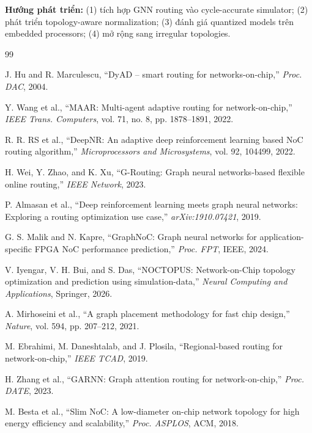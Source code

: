 \documentclass[conference]{IEEEtran}
\begin{document}
\textbf{Hướng phát triển:} (1) tích hợp GNN routing vào cycle-accurate
simulator; (2) phát triển topology-aware normalization; (3) đánh giá
quantized models trên embedded processors; (4) mở rộng sang irregular
topologies.


\begin{thebibliography}{99}

 J. Hu and R. Marculescu, ``DyAD -- smart routing for networks-on-chip,'' \textit{Proc. DAC}, 2004.

 Y. Wang et al., ``MAAR: Multi-agent adaptive routing for network-on-chip,'' \textit{IEEE Trans. Computers}, vol. 71, no. 8, pp. 1878--1891, 2022.

 R. R. RS et al., ``DeepNR: An adaptive deep reinforcement learning based NoC routing algorithm,'' \textit{Microprocessors and Microsystems}, vol. 92, 104499, 2022.

 H. Wei, Y. Zhao, and K. Xu, ``G-Routing: Graph neural networks-based flexible online routing,'' \textit{IEEE Network}, 2023.

 P. Almasan et al., ``Deep reinforcement learning meets graph neural networks: Exploring a routing optimization use case,'' \textit{arXiv:1910.07421}, 2019.

 G. S. Malik and N. Kapre, ``GraphNoC: Graph neural networks for application-specific FPGA NoC performance prediction,'' \textit{Proc. FPT}, IEEE, 2024.

 V. Iyengar, V. H. Bui, and S. Das, ``NOCTOPUS: Network-on-Chip topology optimization and prediction using simulation-data,'' \textit{Neural Computing and Applications}, Springer, 2026.

 A. Mirhoseini et al., ``A graph placement methodology for fast chip design,'' \textit{Nature}, vol. 594, pp. 207--212, 2021.

 M. Ebrahimi, M. Daneshtalab, and J. Plosila, ``Regional-based routing for network-on-chip,'' \textit{IEEE TCAD}, 2019.

 H. Zhang et al., ``GARNN: Graph attention routing for network-on-chip,'' \textit{Proc. DATE}, 2023.

 M. Besta et al., ``Slim NoC: A low-diameter on-chip network topology for high energy efficiency and scalability,'' \textit{Proc. ASPLOS}, ACM, 2018.


\end{thebibliography}
\end{document}
